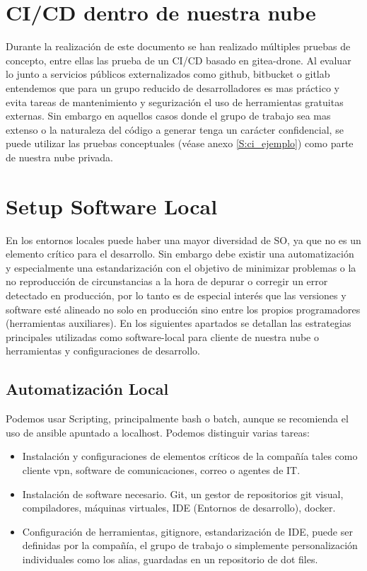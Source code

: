 \section{CI/CD dentro de nuestra nube}
Durante la realización de este documento se han realizado múltiples pruebas de concepto, entre ellas las prueba de un CI/CD basado en gitea\cite{c_gitea}-drone\cite{c_drone}. Al evaluar lo junto a servicios públicos externalizados como github\cite{c_github}, bitbucket\cite{c_bitbucket} o gitlab\cite{c_gitlab} entendemos que para un grupo reducido de desarrolladores es mas práctico y evita tareas de mantenimiento y segurización el uso de herramientas gratuitas externas. Sin embargo en aquellos casos donde el grupo de trabajo sea mas extenso o la naturaleza del código a generar tenga un carácter confidencial, se puede utilizar las pruebas conceptuales (véase anexo \ref{S:ci_ejemplo}) como parte de nuestra nube privada.

\section{Setup Software Local}
En los entornos locales puede haber una mayor diversidad de SO, ya que no es un elemento crítico para el desarrollo. Sin embargo debe existir una automatización y especialmente una estandarización con el objetivo de minimizar problemas o la no reproducción de circunstancias a la hora de depurar o corregir un error detectado en producción, por lo tanto es de especial interés que las versiones y software esté alineado no solo en producción sino entre los propios programadores (herramientas auxiliares). En los siguientes apartados se detallan las estrategias principales utilizadas como software-local para cliente de nuestra nube o herramientas y configuraciones de desarrollo.

\subsection{Automatización Local}
Podemos usar Scripting, principalmente bash o batch, aunque se recomienda el uso de ansible apuntado a localhost. Podemos distinguir varias tareas:
\begin{itemize}
    \item Instalación y configuraciones de elementos críticos de la compañía tales como cliente vpn, software de comunicaciones, correo o agentes de IT.
    \item Instalación de software necesario. Git, un gestor de repositorios git visual, compiladores, máquinas virtuales, IDE (Entornos de desarrollo), docker.
    \item Configuración de herramientas, gitignore, estandarización de IDE, puede ser definidas por la compañía, el grupo de trabajo o simplemente personalización individuales como los alias, guardadas en un repositorio de dot files.
\end{itemize}

